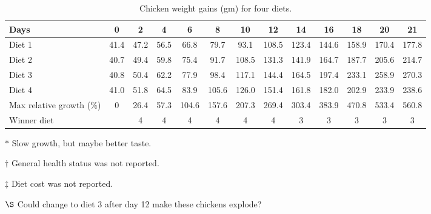 \begin{table*}
\centering
\caption{Chicken weight gains (gm) for four diets.} 
\label{tab:chick}
\vspace{1mm}
\begin{adjustbox}{max width=\textwidth}
\begin{threeparttable}
\begin{tabular}{lcccccccccccc}
\toprule[2pt]
Days & 0 & 2 & 4 & 6 & 8 & 10 & 12 & 14 & 16 & 18 & 20 & 21 \\ 
\midrule[1pt]
Diet 1\tnote{$*$} & 41.4 & 47.2 & 56.5 & 66.8 & 79.7 & 93.1 & 108.5 & 123.4 & 144.6 & 158.9 & 170.4 & 177.8 \\ 
Diet 2\tnote{$\dagger$} & 40.7 & 49.4 & 59.8 & 75.4 & 91.7 & 108.5 & 131.3 & 141.9 & 164.7 & 187.7 & 205.6 & 214.7 \\ 
Diet 3\tnote{$\ddagger$} & 40.8 & 50.4 & 62.2 & 77.9 & 98.4 & 117.1 & 144.4 & 164.5 & 197.4 & 233.1 & 258.9 & 270.3 \\ 
Diet 4\tnote{$\S$} & 41.0 & 51.8 & 64.5 & 83.9 & 105.6 & 126.0 & 151.4 & 161.8 & 182.0 & 202.9 & 233.9 & 238.6 \\ 
\cmidrule(lr){2-13}
  Max relative growth (\%) & 0 & 26.4 & 57.3 & 104.6 & 157.6 & 207.3 & 269.4 & 303.4 & 383.9 & 470.8 & 533.4 & 560.8 \\ 
  Winner diet &  & 4 & 4 & 4 & 4 & 4 & 4 & 3 & 3 & 3 & 3 & 3 \\ 
\bottomrule[2pt]
\end{tabular}
\begin{tablenotes}
\item[$*$] Slow growth, but maybe better taste.
\item[$\dagger$] General health status was not reported.
\item[$\ddagger$] Diet cost was not reported.
\item[$\S$] Could change to diet 3 after day 12 make these chickens explode?
\end{tablenotes}
\end{threeparttable}
\end{adjustbox}
\end{table*}
